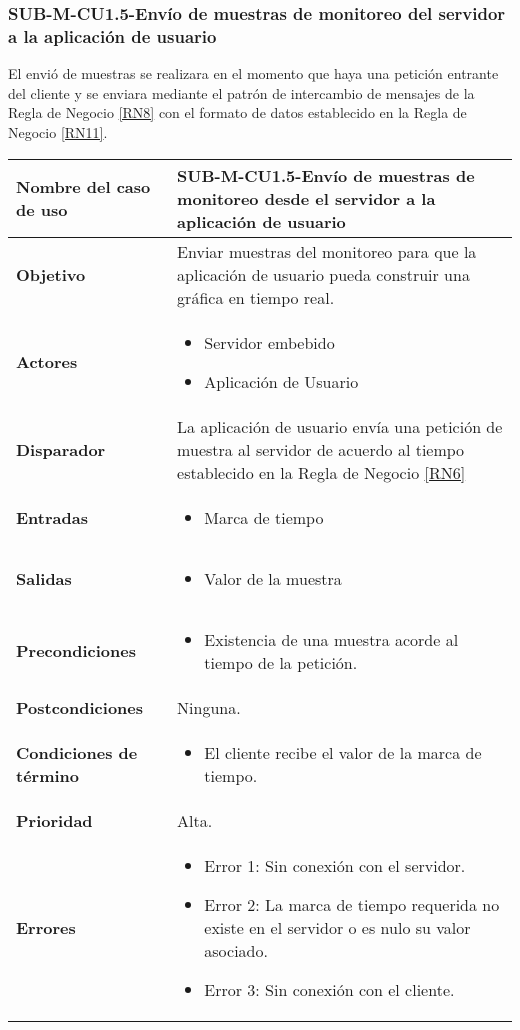 \subsubsection{SUB-M-CU1.5-Envío de muestras de monitoreo del servidor a la aplicación de usuario}\label{SUB-M-CU1.5}
El envió de muestras se realizara en el momento que haya una petición entrante del cliente y se enviara mediante el patrón de intercambio de mensajes de la Regla de Negocio \ref{RN8} con el formato de datos establecido en la Regla de Negocio \ref{RN11}. 

\begin{longtable}{|J{5cm}|J{10.3cm}|}
	\hline
	\textbf{Nombre del caso de uso} &
		SUB-M-CU1.5-Envío de muestras de monitoreo desde el servidor a la aplicación de usuario \\ \hline
	\textbf{Objetivo} &
		Enviar muestras del monitoreo para que la aplicación de usuario pueda construir una gráfica en tiempo real. \\ \hline
	\textbf{Actores} &
		\begin{itemize}
			\item Servidor embebido
			\item Aplicación de Usuario
		\end{itemize} \\ \hline
	\textbf{Disparador} & 
		La aplicación de usuario envía una petición de muestra al servidor de acuerdo al tiempo establecido en la Regla de Negocio \ref{RN6}\\ \hline 
	\textbf{Entradas} & 
		\begin{itemize}
				\item Marca de tiempo
		\end{itemize}\\ \hline 
	\textbf{Salidas} & 
		\begin{itemize}
			\item Valor de la muestra
		\end{itemize} \\ \hline
	\textbf{Precondiciones} &
		\begin{itemize}
			\item Existencia de una muestra acorde al tiempo de la petición.
		\end{itemize}\\ \hline
	\textbf{Postcondiciones} &
		Ninguna.\\ \hline
	\textbf{Condiciones de término} & 
		\begin{itemize}
			\item El cliente recibe el valor de la marca de tiempo.
		\end{itemize} \\ \hline 
	\textbf{Prioridad} & 
		Alta. \\ \hline
	\textbf{Errores} & 
		\begin{itemize}
		    \item \label{CU5:Error1} Error 1: Sin conexión con el servidor.
			\item \label{CU5:Error2} Error 2: La marca de tiempo requerida no existe en el servidor o es nulo su valor asociado.
		    \item \label{CU5:Error3} Error 3: Sin conexión con el cliente.
			

\end{itemize}
\end{longtable}
